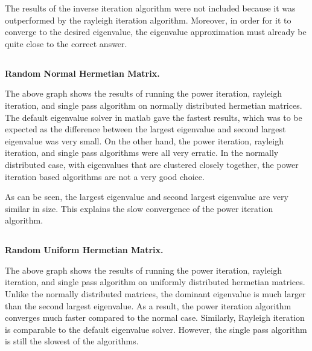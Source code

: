 \documentclass[11pt]{amsart}
\begin{document}
The results of the inverse iteration algorithm were not included because it was outperformed by the rayleigh iteration algorithm. Moreover, in order for it to converge to the desired eigenvalue, the eigenvalue approximation must already be quite close to the correct answer.

\subsection{} \textbf{Random Normal Hermetian Matrix.}

\begin{center}
\end{center}

The above graph shows the results of running the power iteration, rayleigh iteration, and single pass algorithm on normally distributed hermetian matrices. The default eigenvalue solver in matlab gave the fastest results, which was to be expected as the difference between the largest eigenvalue and second largest eigenvalue was very small. On the other hand, the power iteration, rayleigh iteration, and single pass algorithms were all very erratic. In the normally distributed case, with eigenvalues that are clustered closely together, the power iteration based algorithms are not a very good choice.

\begin{center}
\end{center}

As can be seen, the largest eigenvalue and second largest eigenvalue are very similar in size. This explains the slow convergence of the power iteration algorithm.

\subsection{} \textbf{Random Uniform Hermetian Matrix.}

\begin{center}
\end{center}

The above graph shows the results of running the power iteration, rayleigh iteration, and single pass algorithm on uniformly distributed hermetian matrices. Unlike the normally distributed matrices, the dominant eigenvalue is much larger than the second largest eigenvalue. As a result, the power iteration algorithm converges much faster compared to the normal case. Similarly, Rayleigh iteration is comparable to the default eigenvalue solver. However, the single pass algorithm is still the slowest of the algorithms.
\end{document}
